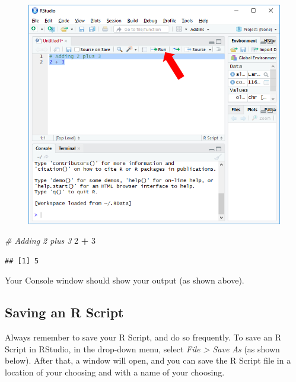 \documentclass[]{book}
\newenvironment{Shaded}{\begin{snugshade}}{\end{snugshade}}
\newcommand{\DecValTok}[1]{\textcolor[rgb]{0.00,0.00,0.81}{#1}}
\newcommand{\StringTok}[1]{\textcolor[rgb]{0.31,0.60,0.02}{#1}}
\newcommand{\CommentTok}[1]{\textcolor[rgb]{0.56,0.35,0.01}{\textit{#1}}}
\newcommand{\OperatorTok}[1]{\textcolor[rgb]{0.81,0.36,0.00}{\textbf{#1}}}
\begin{document}
\begin{figure}
\centering
\includegraphics{Using an R Script.png}
\caption{}
\end{figure}

\begin{Shaded}
\begin{Highlighting}[]
\CommentTok{# Adding 2 plus 3}
\DecValTok{2} \OperatorTok{+}\StringTok{ }\DecValTok{3}
\end{Highlighting}
\end{Shaded}

\begin{verbatim}
## [1] 5
\end{verbatim}

Your Console window should show your output (as shown above).

\subsection{Saving an R Script}\label{saving-an-r-script}

Always remember to save your R Script, and do so frequently. To save an
R Script in RStudio, in the drop-down menu, select \emph{File
\textgreater{} Save As} (as shown below). After that, a window will
open, and you can save the R Script file in a location of your choosing
and with a name of your choosing.
\end{document}
